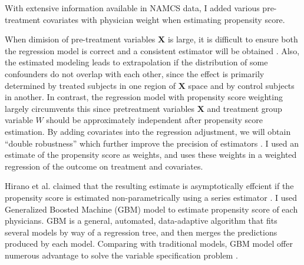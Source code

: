 With extensive information available in NAMCS data, I added various pre-treatment covariates with physician weight when estimating propensity score.  

When dimision of pre-treatment variables $\textbf{X}$ is large, it is difficult to ensure both the regression model is correct and a consistent estimator will be obtained \citep{rubin1997estimating}. Also, the estimated modeling leads to extrapolation if the distribution of some confounders do not overlap with each other, since the effect is primarily determined by treated subjects in one region of $\textbf{X}$ space and by control subjects in another. In contrast, the regression model with propensity score weighting largely circumvents this since pretreatment variables $\textbf{X}$ and treatment group variable $W$ should be approximately independent after propensity score estimation. By adding covariates into the regression adjustment, we will obtain ``double robustness'' which further improve the precision of estimators \citep{lunceford2004stratification}. I used an estimate of the propensity score as weights, and uses these weights in a weighted regression of the outcome on treatment and covariates. 

Hirano et al. claimed that the resulting estimate is asymptotically effcient if the propensity score is estimated non-parametrically using a series estimator \citep{hirano2003efficient}. I used Generalized Boosted Machine (GBM) model to estimate propensity score of each physicians. GBM is a general, automated, data-adaptive algorithm that fits several models by way of a regression tree, and then merges the predictions produced by each model. Comparing with traditional models, GBM model offer numerous advantage to solve the variable specification problem \citep{guo2009propensity}. 

